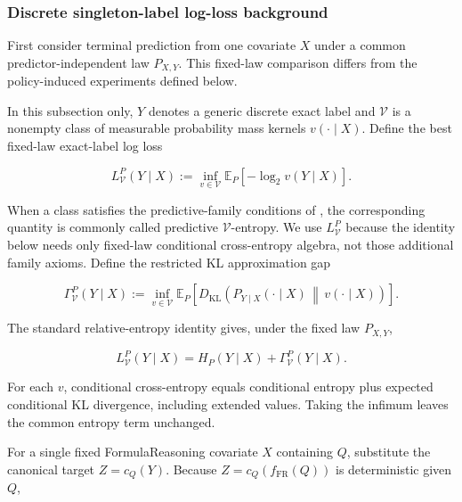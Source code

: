 \documentclass[10pt]{article} %
\providecommand{\1}{\mathbf{1}}  %
\theoremstyle{remark}
\theoremstyle{definition}
\begin{document}
\subsubsection{Discrete singleton-label log-loss background}
\label{subsubsec:discrete-v-background}

First consider terminal prediction from one covariate $X$ under a common
predictor-independent law $P_{X,Y}$. This fixed-law comparison differs
from the policy-induced experiments defined below.

In this subsection only, $Y$ denotes a generic discrete exact label and $\mathcal V$ is a nonempty class of measurable probability mass kernels $v(\cdot\mid X)$. Define the best fixed-law exact-label log loss

\begin{equation}
L_{\mathcal V}^{P}(Y\mid X)
:=
\inf_{v\in\mathcal V}
\mathbb E_{P}\!\left[
-\log_2 v(Y\mid X)
\right].
\label{eq:v-entropy}
\end{equation}

When a class satisfies the predictive-family conditions of
\citet[Definitions~1--2]{xu2020usable}, the corresponding quantity is
commonly called predictive $\mathcal V$-entropy. We use $L_{\mathcal V}^{P}$ because the identity below needs only fixed-law conditional cross-entropy algebra, not those additional family axioms. Define the restricted KL approximation gap

\begin{equation}
\Gamma_{\mathcal V}^{P}(Y\mid X)
:=
\inf_{v\in\mathcal V}
\mathbb E_{P}\!\left[
D_{\mathrm{KL}}\!\left(
P_{Y\mid X}(\cdot\mid X)
\,\middle\|\,
v(\cdot\mid X)
\right)
\right].
\label{eq:accessibility-gap}
\end{equation}

The standard relative-entropy identity
\citep[Sections~2.3--2.4]{cover2006elements} gives, under the fixed law
$P_{X,Y}$,

\begin{equation}
L_{\mathcal V}^{P}(Y\mid X)
=
H_P(Y\mid X)
+
\Gamma_{\mathcal V}^{P}(Y\mid X).
\label{eq:v-cross-entropy-decomposition}
\end{equation}

For each $v$, conditional cross-entropy equals conditional entropy plus
expected conditional KL divergence, including extended values. Taking
the infimum leaves the common entropy term unchanged.

For a single fixed FormulaReasoning covariate $X$ containing $Q$, substitute the canonical target $Z=c_Q(Y)$. Because $Z=c_Q(f_{\mathrm{FR}}(Q))$ is deterministic given $Q$,
\end{document}
